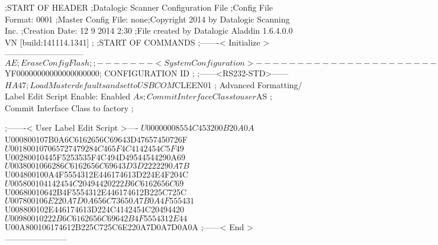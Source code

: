;START OF HEADER
;Datalogic Scanner Configuration File
;Config File Format: 0001
;Master Config File: none;Copyright 2014 by Datalogic Scanning Inc.
;Creation Date: 12 9 2014 2:30
;File created by Datalogic Aladdin 1.6.4.0.0 VN [build:141114.1341]
;
;START OF COMMANDS
;-------< Initialize >-----------------------------
$AE                 ; Erase Config Flash
;
;-------< System Configuration >-------------------------------
$YF00000000000000000000; CONFIGURATION ID
;
;------<RS232-STD>------
$HA47              ; Load Master defaults and set to USBCOM
$CLEEN01            ; Advanced Formatting/ Label Edit Script Enable: Enabled
$As                 ; Commit Interface Class to user
$AS                 ; Commit Interface Class to factory
;

;-------< User Label Edit Script >----
$U00000008554C453200B20A0A
$U000800107B0A6C6162656C69643D47657450726F
$U001800107065727479284C465F4C4142454C5F49
$U00280010445F5253535F4C494D49544544290A69
$U0038001066286C6162656C69643D3D2222290A7B
$U004800100A4F5554312E446174613D224E4F204C
$U005800104142454C20494420222B6C6162656C69
$U00680010642B4F5554312E446174612B225C725C
$U007800106E220A7D0A656C73650A7B0A4F555431
$U008800102E446174613D224C4142454C20494420
$U00980010222B6C6162656C69642B4F5554312E44
$U00A800106174612B225C725C6E220A7D0A7D0A0A
;------< End >-----------------------
